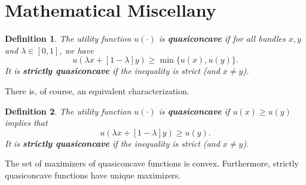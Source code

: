 \documentclass[11pt, twocolumn]{article}
\newtheorem{definition}{Definition}
\theoremstyle{definition}
\begin{document}
\section*{Mathematical Miscellany}

\begin{definition}
The utility function $u(\cdot)$ is  \textbf{quasiconcave} if for all bundles $x, y$ and $\lambda \in [0,1]$, we have
	\[ u( \lambda x + [1 - \lambda]y) \geq \min \{ u(x), u(y)\}.	\]	
It is \textbf{strictly quasiconcave} if the inequality is strict (and $x \neq y$).
\end{definition}
There is, of course, an equivalent characterization. 
\begin{definition}
The utility function $u(\cdot)$ is  \textbf{quasiconcave} if $u(x) \geq u(y)$ implies that
	\[ u( \lambda x + [1 - \lambda]y) \geq u(y).	\]	
It is \textbf{strictly quasiconcave} if the inequality is strict (and $x \neq y$).
\end{definition}
The set of maximizers of quasiconcave functions is convex. Furthermore, strictly quasiconcave functions have unique maximizers. 
\end{document}
